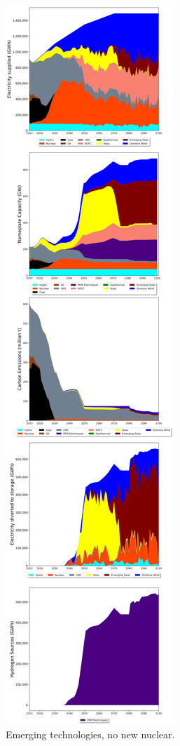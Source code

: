 \begin{figure}[h] 
\centering
\label{scen4}
\includegraphics[scale=0.15]{figures/newtechs_nuc}
\caption{Emerging technologies, no new nuclear.}
\end{figure}

